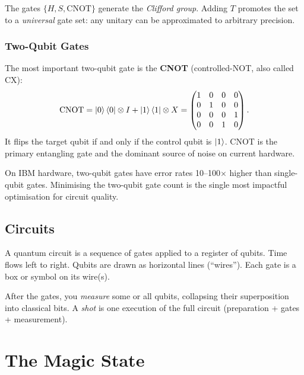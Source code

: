 \documentclass[11pt,a4paper,twoside]{report}
\theoremstyle{definition}
\begin{document}
The gates $\{H, S, \text{CNOT}\}$ generate the \emph{Clifford group}.
Adding $T$ promotes the set to a \emph{universal} gate set: any unitary
can be approximated to arbitrary precision.

\subsection{Two-Qubit Gates}

The most important two-qubit gate is the \textbf{CNOT} (controlled-NOT,
also called CX):
\begin{equation}
  \text{CNOT} = \ket{0}\bra{0}\otimes I + \ket{1}\bra{1}\otimes X
  = \begin{pmatrix} 1&0&0&0\\ 0&1&0&0\\ 0&0&0&1\\ 0&0&1&0 \end{pmatrix}.
\end{equation}
It flips the target qubit if and only if the control qubit is
$\ket{1}$. CNOT is the primary entangling gate and the dominant source
of noise on current hardware.

\begin{intuition}
On IBM hardware, two-qubit gates have error rates 10--100$\times$
higher than single-qubit gates. Minimising the two-qubit gate count is
the single most impactful optimisation for circuit quality.
\end{intuition}

\section{Circuits}

A quantum circuit is a sequence of gates applied to a register of
qubits. Time flows left to right. Qubits are drawn as horizontal lines
(``wires''). Each gate is a box or symbol on its wire(s).

After the gates, you \emph{measure} some or all qubits, collapsing
their superposition into classical bits. A \emph{shot} is one execution
of the full circuit (preparation + gates + measurement).

\chapter{The Magic State}
\label{ch:magic}
\end{document}
